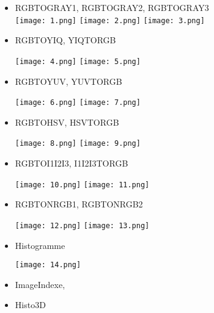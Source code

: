 \documentclass[12pt,a4paper,notitlepage]{report}
\begin{document}
\begin{itemize}
	\item RGBTOGRAY1, RGBTOGRAY2, RGBTOGRAY3\\
	\texttt{[image: 1.png]} 
\texttt{[image: 2.png]}
\texttt{[image: 3.png]}
	\item RGBTOYIQ, YIQTORGB\\
	\begin{center}
		\texttt{[image: 4.png]} 
		\texttt{[image: 5.png]}
	\end{center}
	\item RGBTOYUV, YUVTORGB
	\begin{center}
		\texttt{[image: 6.png]} 
		\texttt{[image: 7.png]}
	\end{center}
	\item RGBTOHSV, HSVTORGB
	\begin{center}
		\texttt{[image: 8.png]} 
		\texttt{[image: 9.png]}
	\end{center}
	\item RGBTOI1I2I3, I1I2I3TORGB
	\begin{center}
		\texttt{[image: 10.png]} 
		\texttt{[image: 11.png]}
	\end{center}
	\item RGBTONRGB1, RGBTONRGB2
	\begin{center}
		\texttt{[image: 12.png]} 
		\texttt{[image: 13.png]}
	\end{center}
	\item Histogramme
	\begin{center}
		\texttt{[image: 14.png]} 
	\end{center}
	\item ImageIndexe,
	\item Histo3D
\end{itemize}
\end{document}
